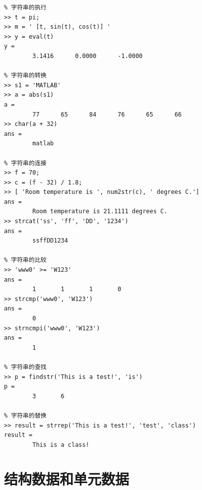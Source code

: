 \newpage
\begin{lstlisting}
% 字符串的执行
>> t = pi;
>> m = ' [t, sin(t), cos(t)] '
>> y = eval(t)
y =
		3.1416		0.0000		-1.0000

% 字符串的转换
>> s1 = 'MATLAB'
>> a = abs(s1)
a =
		77		65		84		76		65		66
>> char(a + 32)
ans =
		matlab
		
% 字符串的连接
>> f = 70;
>> c = (f - 32) / 1.8;
>> [ 'Room temperature is ', num2str(c), ' degrees C.']
ans =
		Room temperature is 21.1111 degrees C.
>> strcat('ss', 'ff', 'DD', '1234')
ans =
		ssffDD1234
		
% 字符串的比较
>> 'www0' >= 'W123'
ans =
		1		1		1		0
>> strcmp('www0', 'W123')
ans =
		0
>> strncmpi('www0', 'W123')
ans =
		1

% 字符串的查找
>> p = findstr('This is a test!', 'is')
p = 
		3		6
		
% 字符串的替换
>> result = strrep('This is a test!', 'test', 'class')
result =
		This is a class!
\end{lstlisting}

\section{结构数据和单元数据}
